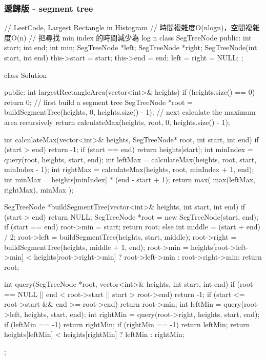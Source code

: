 \subsubsection{遞歸版 - segment tree}
\begin{Code}
// LeetCode, Largest Rectangle in Histogram
// 時間複雜度O(nlogn)，空間複雜度O(n)
// 把尋找 min index 的時間減少為 log n
class SegTreeNode {
public:
    int start;
    int end;
    int min;
    SegTreeNode *left;
    SegTreeNode *right;
    SegTreeNode(int start, int end) {
        this->start = start;
        this->end = end;
        left = right = NULL;
    }
};

class Solution {
public:
    int largestRectangleArea(vector<int>& heights) {
        if (heights.size() == 0) return 0;
        // first build a segment tree
        SegTreeNode *root = buildSegmentTree(heights, 0, heights.size() - 1);
        // next calculate the maximum area recursively
        return calculateMax(heights, root, 0, heights.size() - 1);
    }

    int calculateMax(vector<int>& heights, SegTreeNode* root, int start, int end) {
        if (start > end) {
            return -1;
        }
        if (start == end) {
            return heights[start];
        }
        int minIndex = query(root, heights, start, end);
        int leftMax = calculateMax(heights, root, start, minIndex - 1);
        int rightMax = calculateMax(heights, root, minIndex + 1, end);
        int minMax = heights[minIndex] * (end - start + 1);
        return max( max(leftMax, rightMax), minMax );
    }

    SegTreeNode *buildSegmentTree(vector<int>& heights, int start, int end) {
        if (start > end) return NULL;
        SegTreeNode *root = new SegTreeNode(start, end);
        if (start == end) {
            root->min = start;
            return root;
        } else {
            int middle = (start + end) / 2;
            root->left = buildSegmentTree(heights, start, middle);
            root->right = buildSegmentTree(heights, middle + 1, end);
            root->min = heights[root->left->min] < heights[root->right->min] ? root->left->min : root->right->min;
            return root;
        }
    }

    int query(SegTreeNode *root, vector<int>& heights, int start, int end) {
        if (root == NULL || end < root->start || start > root->end) return -1;
        if (start <= root->start && end >= root->end) {
            return root->min;
        }
        int leftMin = query(root->left, heights, start, end);
        int rightMin = query(root->right, heights, start, end);
        if (leftMin == -1) return rightMin;
        if (rightMin == -1) return leftMin;
        return heights[leftMin] < heights[rightMin] ? leftMin : rightMin;
    }
};
\end{Code}

